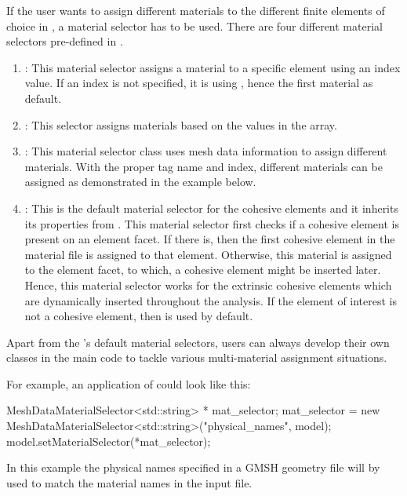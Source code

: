 If the user wants to assign different materials to the different
finite elements of choice in \akantu, a material selector has to be
used. There are four different material selectors pre-defined in
\akantu.

\begin{enumerate}
\item {}: This material selector assigns a
  material to a specific element using an index value. If an index is
  not specified, it is using , hence the first material as
  default.
\item {}: This selector assigns materials
  based on the values in the 
  array.
\item {}: This material selector class
  uses mesh data information to assign different materials. With the
  proper tag name and index, different materials can be assigned as
  demonstrated in the example below.
\item {}: This is the default
  material selector for the cohesive elements and it inherits its
  properties from . This material
  selector first checks if a cohesive element is present on an element
  facet. If there is, then the first cohesive element in the material
  file is assigned to that element. Otherwise, this material is
  assigned to the element facet, to which, a cohesive element might be
  inserted later. Hence, this material selector works for the
  extrinsic cohesive elements which are dynamically inserted
  throughout the analysis. If the element of interest is not a
  cohesive element, then  is used by
  default.
\end{enumerate}

Apart from the \akantu's default material selectors, users can always
develop their own classes in the main code to tackle various
multi-material assignment situations.

For example, an application of  could
look like this:

\begin{cpp}
  MeshDataMaterialSelector<std::string> * mat_selector;
  mat_selector = new MeshDataMaterialSelector<std::string>("physical_names", model);
  model.setMaterialSelector(*mat_selector);
\end{cpp}

In this example the physical names specified in a GMSH geometry file will by
used to match the material names in the input file.

